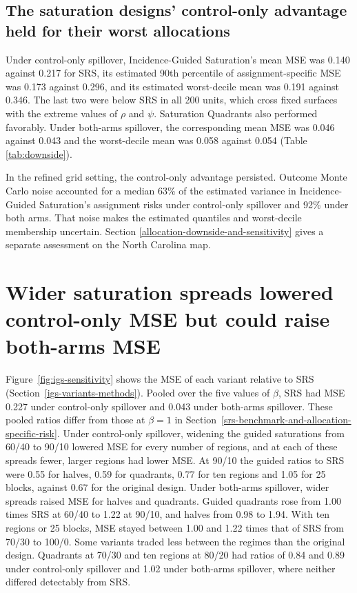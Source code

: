 \documentclass[11pt]{article}
\begin{document}
\subsection{The saturation designs' control-only advantage held for their worst allocations}\label{allocation-risk-results}


Under control-only spillover, Incidence-Guided Saturation's mean MSE
was 0.140 against 0.217 for SRS, its estimated 90th percentile of
assignment-specific MSE was 0.173 against 0.296, and its estimated
worst-decile mean was 0.191 against 0.346. The last two were below SRS
in all 200 units, which cross fixed surfaces with the extreme values of
\(\rho\) and \(\psi\). Saturation Quadrants also performed favorably.
Under both-arms spillover, the corresponding mean MSE was 0.046 against
0.043 and the worst-decile mean was 0.058 against 0.054 (Table
\ref{tab:downside}).

In the refined grid setting, the control-only advantage persisted.
Outcome Monte Carlo noise accounted for a median 63\% of the estimated
variance in Incidence-Guided Saturation's assignment risks under
control-only spillover and 92\% under both arms. That noise makes the
estimated quantiles and worst-decile membership uncertain. Section
\ref{allocation-downside-and-sensitivity} gives a separate assessment
on the North Carolina map.

\FloatBarrier
\section{Wider saturation spreads lowered control-only MSE but could raise both-arms MSE}\label{igs-sensitivity-results}

Figure~\ref{fig:igs-sensitivity} shows the MSE of each variant relative to SRS (Section~\ref{igs-variants-methods}). Pooled over the five values of \(\beta\), SRS had MSE 0.227 under control-only spillover and 0.043 under both-arms spillover. These pooled ratios differ from those at \(\beta = 1\) in Section~\ref{srs-benchmark-and-allocation-specific-risk}. Under control-only spillover, widening the guided saturations from 60/40 to 90/10 lowered MSE for every number of regions, and at each of these spreads fewer, larger regions had lower MSE. At 90/10 the guided ratios to SRS were 0.55 for halves, 0.59 for quadrants, 0.77 for ten regions and 1.05 for 25 blocks, against 0.67 for the original design. Under both-arms spillover, wider spreads raised MSE for halves and quadrants. Guided quadrants rose from 1.00 times SRS at 60/40 to 1.22 at 90/10, and halves from 0.98 to 1.94. With ten regions or 25 blocks, MSE stayed between 1.00 and 1.22 times that of SRS from 70/30 to 100/0. Some variants traded less between the regimes than the original design. Quadrants at 70/30 and ten regions at 80/20 had ratios of 0.84 and 0.89 under control-only spillover and 1.02 under both-arms spillover, where neither differed detectably from SRS.
\end{document}
